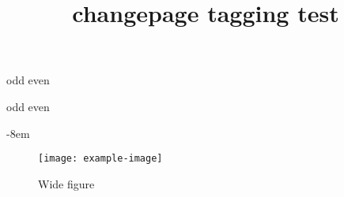 \documentclass{article}
\title{changepage tagging test}
\begin{document}
\checkoddpage
\ifoddpage
odd
\else
even
\fi

\newpage

\checkoddpage
\ifoddpage
odd
\else
even
\fi

\kant[1]
\begin{adjustwidth}{}{-8em}
\kant[2-5]
\end{adjustwidth}
\begin{adjustwidth}{-4em}{-4em}
\kant[3]
\end{adjustwidth}

\begin{figure}
\begin{adjustwidth}{-2em}{-2em}
\texttt{[image: example-image]}
\caption{Wide figure}
\end{adjustwidth}
\end{figure}

\clearpage
{}
\twocolumn
\kant[1-3]
\clearpage
{}
\onecolumn
\kant[1-3]
\changetext{0pt}{5em}{}{}{}%
\kant[4-5]
\changetext{0pt}{-5em}{}{}{}
\kant[6-7]
\end{document}
